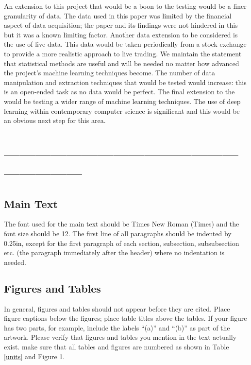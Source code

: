 \documentclass[conference]{IEEEtran}
\begin{document}
An extension to this project that would be a boon to the testing would be a finer granularity of data. The data used in this paper was limited by the financial aspect of data acquisition; the paper and its findings were not hindered in this but it was a known limiting factor. Another data extension to be  considered is the use of live data. This data would be taken periodically from a stock exchange to provide a more realistic approach to live trading. We maintain the statement that statistical methods are useful and will be needed no matter how advanced the project's machine learning techniques become. The number of data manipulation and extraction techniques that would be tested would increase: this is an open-ended task as no data would be perfect. The final extension to the would be testing a wider range of machine learning techniques. The use of deep learning within contemporary computer science is significant and this would be an obvious next step for this area.

\nocite{*}

\iffalse
\section*{------------------------------------------------------------}

\subsection{Main Text}

The font used for the main text should be Times New Roman (Times) and the font size should be 12.  The first line of all paragraphs should be indented by 0.25in, except for the first paragraph of each section, subsection, subsubsection etc. (the paragraph immediately after the header) where no indentation is needed.

\subsection{Figures and Tables}
In general, figures and tables should not appear before they are cited.  Place figure captions below the figures; place table titles above the tables.  If your figure has two parts, for example, include the labels ``(a)'' and ``(b)'' as part of the artwork.  Please verify that figures and tables you mention in the text actually exist.  make sure that all tables and figures are numbered as shown in Table \ref{units} and Figure 1.
\end{document}

